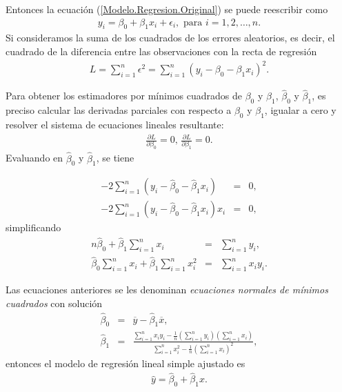 \documentclass[a4paper]{report} %
\begin{document}
Entonces la ecuaci\'on (\ref{Modelo.Regresion.Original}) se puede reescribir como
\begin{eqnarray}\label{Modelo.Regresion.dos.Original}
y_{i}=\beta_{0}+\beta_{1}x_{i}+\epsilon_{i},\textrm{ para }i=1,2,\ldots,n.
\end{eqnarray}
Si consideramos la suma de los cuadrados de los errores aleatorios, es decir, el cuadrado de la diferencia entre las observaciones con la recta de regresi\'on 
\begin{eqnarray}
L=\sum_{i=1}^{n}\epsilon^{2}=\sum_{i=1}^{n}\left(y_{i}-\beta_{0}-\beta_{1}x_{i}\right)^{2}.
\end{eqnarray}

Para obtener los estimadores por m\'inimos cuadrados de $\beta_{0}$ y $\beta_{1}$,  $\hat{\beta}_{0}$ y $\hat{\beta}_{1}$, es preciso calcular las derivadas parciales con respecto a $\beta_{0}$ y $\beta_{1}$,  igualar a cero y  resolver el sistema de ecuaciones lineales resultante:
\begin{eqnarray*}
\frac{\partial L}{\partial \beta_{0}}=0\textrm{, }\frac{\partial L}{\partial \beta_{1}}=0.
\end{eqnarray*}
Evaluando en $\hat{\beta}_{0}$ y $\hat{\beta}_{1}$, se tiene 

\begin{eqnarray*}
-2\sum_{i=1}^{n}\left(y_{i}-\hat{\beta}_{0}-\hat{\beta}_{1}x_{i}\right)&=&0,\\
-2\sum_{i=1}^{n}\left(y_{i}-\hat{\beta}_{0}-\hat{\beta}_{1}x_{i}\right)x_{i}&=&0,
\end{eqnarray*}
simplificando
\begin{eqnarray*}
n\hat{\beta}_{0}+\hat{\beta}_{1}\sum_{i=1}^{n}x_{i}&=&\sum_{i=1}^{n}y_{i},\\
\hat{\beta}_{0}\sum_{i=1}^{n}x_{i}+\hat{\beta}_{1}\sum_{i=1}^{n}x_{i}^{2}&=&\sum_{i=1}^{n}x_{i}y_{i}.
\end{eqnarray*}

Las ecuaciones anteriores se les denominan \textit{ecuaciones normales de m\'inimos cuadrados} con soluci\'on
\begin{eqnarray}\label{Ec.Normales.Min.Cuadrados}
\hat{\beta}_{0}&=&\overline{y}-\hat{\beta}_{1}\overline{x},\\
\hat{\beta}_{1}&=&\frac{\sum_{i=1}^{n}x_{i}y_{i}-\frac{1}{n}\left(\sum_{i=1}^{n}y_{i}\right)\left(\sum_{i=1}^{n}x_{i}\right)}{\sum_{i=1}^{n}x_{i}^{2}-\frac{1}{n}\left(\sum_{i=1}^{n}x_{i}\right)^{2}},
\end{eqnarray}
entonces el modelo de regresi\'on lineal simple ajustado es
\begin{eqnarray}
\hat{y}=\hat{\beta}_{0}+\hat{\beta}_{1}x.
\end{eqnarray}
\end{document}
